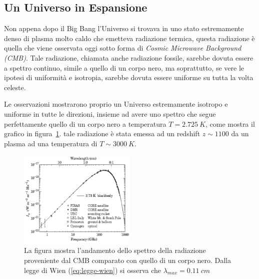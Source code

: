 \subsection{Un Universo in Espansione}\label{sec:unverso-espansione}
Non appena dopo il Big Bang l'Universo si trovava in uno stato estremamente denso di plasma molto caldo che emetteva radiazione termica, questa radiazione è quella che viene osservata oggi sotto forma di \textit{Cosmic Microwave Background (CMB)}. Tale radiazione, chiamata anche radiazione fossile, sarebbe dovuta essere a spettro continuo, simile a quello di un corpo nero, ma soprattutto, se vere le ipotesi di uniformità e isotropia, sarebbe dovuta essere uniforme su tutta la volta celeste. 

Le osservazioni mostrarono proprio un Universo estremamente isotropo e uniforme in tutte le direzioni, insieme ad avere uno spettro che segue perfettamente quello di un corpo nero a temperatura $T = \SI{2.725}{K}$, come mostra il grafico in figura~\ref{fig:balckbody-universe}. tale radiazione è stata emessa ad un redshift $z \sim 1100$ da un plasma ad una temperatura di $T \sim \SI{3000}{K}$.
\begin{figure}
    \centering
    \includegraphics[width = 0.5\textwidth]{immagini/blackbody-universe.png}
    \caption{La figura mostra l'andamento dello spettro della radiazione proveniente dal CMB comparato con quello di un corpo nero. Dalla legge di Wien (\ref{eq:legge-wien}) si osserva che $\lambda_{max}= \SI{0.11}{cm}$}\label{fig:balckbody-universe}
\end{figure}

